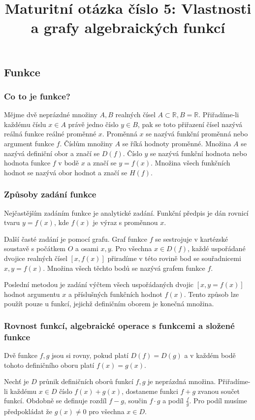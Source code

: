 \documentclass[12pt]{article}
\title{Maturitní otázka číslo 5: Vlastnosti a grafy algebraických funkcí}
\author{}
\date{}
\begin{document}
\maketitle
\subsection*{Funkce}
\subsubsection*{Co to je funkce?}
Mějme dvě neprázdné množiny $A, B$ realných čísel $A \subset \mathbb{R}, B = \mathbb{R}$. Přiřadíme-li
každému číslu $x \in A$ právě jedno číslo $y \in B$, pak se toto přiřazení čísel nazývá reálná funkce
reálné proměnné $x$. Proměnná $x$ se nazývá funkční proměnná nebo argument funkce $f$. Číslům množiny
$A$ se říká hodnoty proměnné. Množina $A$ se nazývá definiční obor a značí se $D(f)$. Číslo $y$ se
nazývá funkční hodnota nebo hodnota funkce $f$ v bodě $x$ a značí se $y = f(x)$. Množina všech
funkčních hodnot se nazývá obor hodnot a značí se $H(f)$.
\subsubsection*{Způsoby zadání funkce}
Nejčastějším zadáním funkce je analytické zadání. Funkční předpis je dán rovnicí tvaru $y = f(x)$,
kde $f(x)$ je výraz s proměnnou $x$.

Další časté zadání je pomocí grafu. Graf funkce $f$ se sestrojuje v kartézské soustavě s počátkem
$O$ a osami $x, y$. Pro všechna $x \in D(f)$, každé uspořádané dvojice realných čísel $[x, f(x)]$
přiradíme v této rovině bod se souřadnicemi $x, y = f(x)$. Množina všech těchto bodů se nazývá grafem
funkce $f$.

Poslední metodou je zadání výčtem všech uspořádaných dvojic $[x, y = f(x)]$ hodnot argumentu $x$ a
příslušných funkčních hodnot $f(x)$. Tento způsob lze použít pouze u funkcí, jejichž definičním oborem
je konečná množina.
\subsubsection*{Rovnost funkcí, algebraické operace s funkcemi a složené funkce}
Dvě funkce $f, g$ jsou si rovny, pokud platí $D(f) = D(g)$ a v každém bodě tohoto definičního oboru
platí $f(x) = g(x)$.

Nechť je $D$ průnik definičních oborů funkcí $f, g$ je neprázdná množina. Přiřadíme-li každému $x \in
D$ číslo $f(x) + g(x)$, dostaneme funkci $f + g$ zvanou součet funkcí. Obdobně se definuje rozdíl $f
- g$, součin $f \cdot g$ a podíl $\frac{f}{g}$. Pro podíl musíme předpokládat že $g(x) \ne 0$ pro
všechna $x \in D$.
\end{document}
